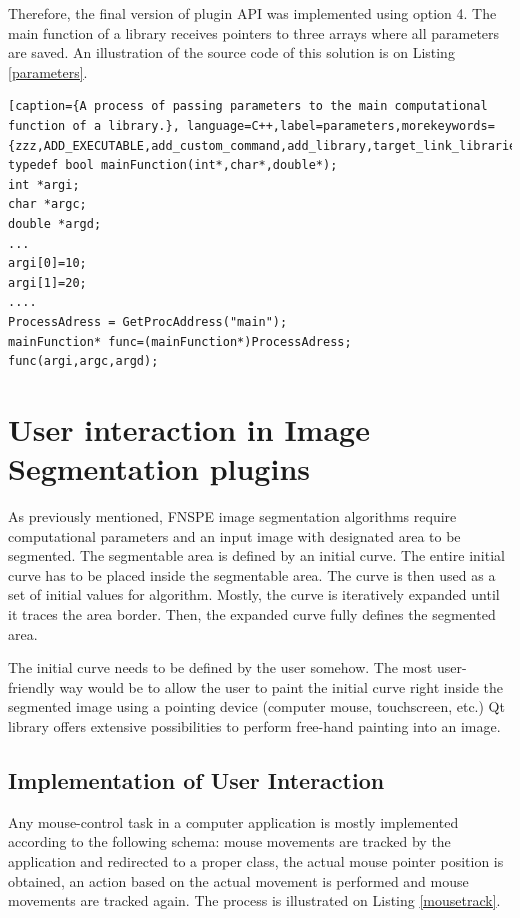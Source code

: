Therefore, the final version of plugin API was implemented using option 4. The main function of a library receives pointers to three arrays where all parameters are saved. An illustration of the source code of this solution is on Listing \ref{parameters}.

\begin{lstlisting}[caption={A process of passing parameters to the main computational function of a library.}, language=C++,label=parameters,morekeywords={zzz,ADD_EXECUTABLE,add_custom_command,add_library,target_link_libraries,OUTPUT,COMMAND,xxx})]
typedef bool mainFunction(int*,char*,double*);
int *argi;
char *argc;
double *argd;
...
argi[0]=10;
argi[1]=20;
....
ProcessAdress = GetProcAddress("main");
mainFunction* func=(mainFunction*)ProcessAdress;
func(argi,argc,argd);
\end{lstlisting}

\section{User interaction in Image Segmentation plugins}
As previously mentioned, FNSPE image segmentation algorithms require computational parameters and an input image with designated area to be segmented. The segmentable area is defined by an initial curve. The entire initial curve has to be placed inside the segmentable area. The curve is then used as a set of initial values for algorithm. Mostly, the curve is iteratively expanded until it traces the area border. Then, the expanded curve fully defines the segmented area.

The initial curve needs to be defined by the user somehow. The most user-friendly way would be to allow the user to paint the initial curve right inside the segmented image using a pointing device (computer mouse, touchscreen, etc.) Qt library offers extensive possibilities to perform free-hand painting into an image.


\subsection{Implementation of User Interaction}

Any mouse-control task in a computer application is mostly implemented according to the following schema: mouse movements are tracked by the application and redirected to a proper class, the actual mouse pointer position is obtained, an action based on the actual movement is performed and mouse movements are tracked again. The process is illustrated on Listing \ref{mousetrack}.

